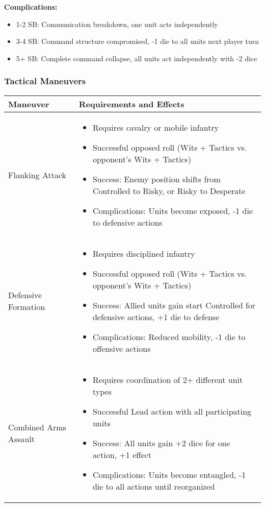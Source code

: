 \textbf{Complications:}
\begin{itemize}[leftmargin=*]
    \item 1-2 SB: Communication breakdown, one unit acts independently
    \item 3-4 SB: Command structure compromised, -1 die to all units next player turn
    \item 5+ SB: Complete command collapse, all units act independently with -2 dice
\end{itemize}

\subsubsection{Tactical Maneuvers}
\begin{longtable}{|>{\raggedright\arraybackslash}p{4cm}|>{\raggedright\arraybackslash}p{8cm}|}
\hline
\textbf{Maneuver} & \textbf{Requirements and Effects} \\
\hline
Flanking Attack & 
\begin{itemize}
    \item Requires cavalry or mobile infantry
    \item Successful opposed roll (Wits + Tactics vs. opponent's Wits + Tactics)
    \item Success: Enemy position shifts from Controlled to Risky, or Risky to Desperate
    \item Complications: Units become exposed, -1 die to defensive actions
\end{itemize} \\
\hline
Defensive Formation & 
\begin{itemize}
    \item Requires disciplined infantry
    \item Successful opposed roll (Wits + Tactics vs. opponent's Wits + Tactics)
    \item Success: Allied units gain start Controlled for defensive actions, +1 die to defense
    \item Complications: Reduced mobility, -1 die to offensive actions
\end{itemize} \\
\hline
Combined Arms Assault & 
\begin{itemize}
    \item Requires coordination of 2+ different unit types
    \item Successful Lead action with all participating units
    \item Success: All units gain +2 dice for one action, +1 effect
    \item Complications: Units become entangled, -1 die to all actions until reorganized
\end{itemize} \\
\hline
\end{longtable}

